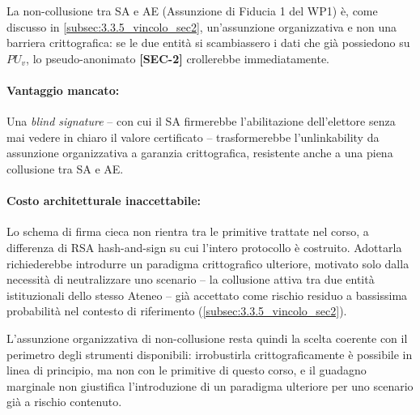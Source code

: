 La non-collusione tra SA e AE (Assunzione di Fiducia 1 del WP1) è, come discusso in \ref{subsec:3.3.5_vincolo_sec2}, un'assunzione organizzativa e non una barriera crittografica: se le due entità si scambiassero i dati che già possiedono su $PU_v$, lo pseudo-anonimato \textbf{[SEC-2]} crollerebbe immediatamente.

\paragraph{Vantaggio mancato:} Una \textit{blind signature} -- con cui il SA firmerebbe l'abilitazione dell'elettore senza mai vedere in chiaro il valore certificato -- trasformerebbe l'unlinkability da assunzione organizzativa a garanzia crittografica, resistente anche a una piena collusione tra SA e AE.

\paragraph{Costo architetturale inaccettabile:} Lo schema di firma cieca non rientra tra le primitive trattate nel corso, a differenza di RSA hash-and-sign su cui l'intero protocollo è costruito. Adottarla richiederebbe introdurre un paradigma crittografico ulteriore, motivato solo dalla necessità di neutralizzare uno scenario -- la collusione attiva tra due entità istituzionali dello stesso Ateneo -- già accettato come rischio residuo a bassissima probabilità nel contesto di riferimento (\ref{subsec:3.3.5_vincolo_sec2}).

L'assunzione organizzativa di non-collusione resta quindi la scelta coerente con il perimetro degli strumenti disponibili: irrobustirla crittograficamente è possibile in linea di principio, ma non con le primitive di questo corso, e il guadagno marginale non giustifica l'introduzione di un paradigma ulteriore per uno scenario già a rischio contenuto.